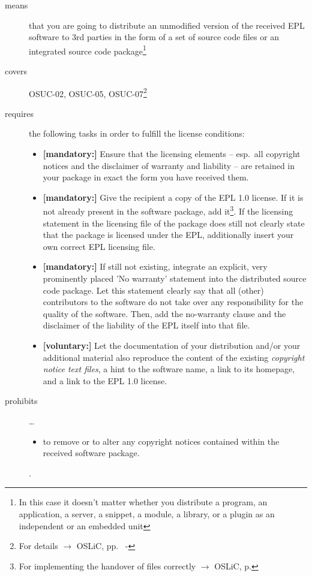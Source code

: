\begin{description}

\item[means] that you are going to distribute an unmodified version of the
received EPL software to 3rd parties in the form of a set of source code files or
an integrated source code package\footnote{In this case it doesn't matter
whether you  distribute a program, an application, a server, a snippet, a
module, a library, or a plugin as an independent or an embedded unit}

\item[covers] OSUC-02, OSUC-05, OSUC-07\footnote{For details $\rightarrow$ OSLiC, pp.\ 
\pageref{OSUC-02-DEF} - \pageref{OSUC-07-DEF}}

\item[requires] the following tasks in order to fulfill the license conditions:
\begin{itemize}
  
  \item \textbf{[mandatory:]} Ensure that the licensing elements -- esp.\ all
  copyright notices and the disclaimer of warranty and liability -- are retained
  in your package in exact the form you have received them.
  
  \item \textbf{[mandatory:]} Give the recipient a copy of the EPL 1.0 license.
  If it is not already present in the software package, add it\footnote{For
  implementing the handover of files correctly $\rightarrow$ OSLiC, p.
  \pageref{DistributingFilesHint}}. If the licensing statement in the licensing
  file of the package does still not clearly state that the package is licensed
  under the EPL, additionally insert your own correct EPL licensing file.
  
  \item \textbf{[mandatory:]} If still not existing, integrate an explicit, very
  prominently placed 'No warranty' statement into the distributed source code
  package. Let this statement clearly say that all (other) contributors to the
  software do not take over any responsibility for the quality of the software.
  Then, add the no-warranty clause and the disclaimer of the liability of the
  EPL itself into that file.
  
  \item \textbf{[voluntary:]} Let the documentation of your distribution and/or
  your additional material also reproduce the content of the existing
  \emph{copyright notice text files}, a hint to the software name, a link to its
  homepage, and a link to the EPL 1.0 license.
\end{itemize}

\item[prohibits] \ldots
\begin{itemize}
  \item to remove or to alter any copyright notices contained within the
  received software package.
\end{itemize}.

\end{description}


